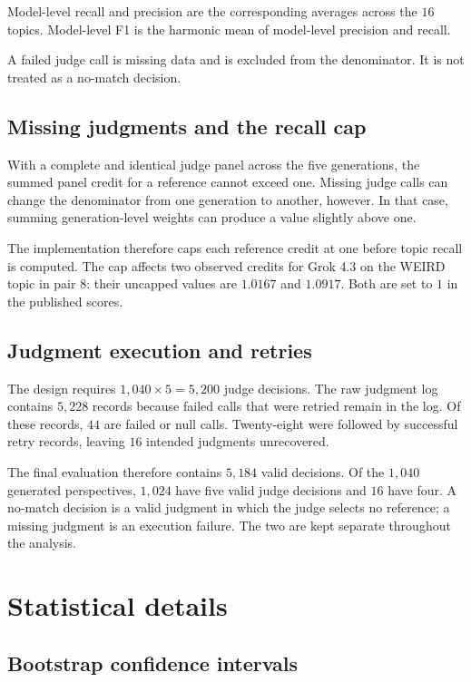 \documentclass[11pt,a4paper]{article}
\begin{document}
Model-level recall and precision are the corresponding averages across the $16$ topics. Model-level F1 is the harmonic mean of model-level precision and recall.

A failed judge call is missing data and is excluded from the denominator. It is not treated as a no-match decision.

\subsection{Missing judgments and the recall cap}
\label{app:missing_judgments}

With a complete and identical judge panel across the five generations, the summed panel credit for a reference cannot exceed one. Missing judge calls can change the denominator from one generation to another, however. In that case, summing generation-level weights can produce a value slightly above one.

The implementation therefore caps each reference credit at one before topic recall is computed. The cap affects two observed credits for Grok 4.3 on the WEIRD topic in pair $8$: their uncapped values are $1.0167$ and $1.0917$. Both are set to $1$ in the published scores.

\subsection{Judgment execution and retries}
\label{app:judgment_counts}

The design requires $1{,}040\times5=5{,}200$ judge decisions. The raw judgment log contains $5,228$ records because failed calls that were retried remain in the log. Of these records, $44$ are failed or null calls. Twenty-eight were followed by successful retry records, leaving $16$ intended judgments unrecovered.

The final evaluation therefore contains $5,184$ valid decisions. Of the $1,040$ generated perspectives, $1,024$ have five valid judge decisions and $16$ have four. A no-match decision is a valid judgment in which the judge selects no reference; a missing judgment is an execution failure. The two are kept separate throughout the analysis.

\section{Statistical details}
\label{app:statistics}

\subsection{Bootstrap confidence intervals}
\label{app:bootstrap}
\end{document}
